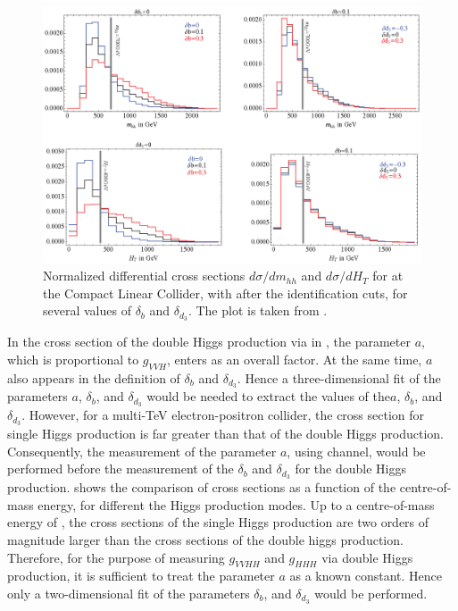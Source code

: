 \begin{figure}[htbp]
\centering
\includegraphics[width=1\textwidth]{theory/MhhHtDistribution}
\caption[]
{Normalized differential cross sections $d\sigma/dm_{hh}$ and $d\sigma/dH_{T}$ for  at the Compact Linear Collider, with  after the identification cuts, for several values of $\delta_{b}$ and $\delta_{d_3}$. The plot is taken from \cite{Contino:2013gna}.}
\label{fig:theoryMhhHtDistribution}
\end{figure}

In the cross section of the double Higgs production via   in , the parameter $a$, which is proportional to $g_{VVH}$, enters as an overall factor. At the same time, $a$ also appears in the definition of $\delta_{b}$ and $\delta_{d_3}$. Hence a three-dimensional fit of the parameters $a$, $\delta_{b}$, and $\delta_{d_3}$ would be needed to extract the values of the$a$, $\delta_{b}$, and $\delta_{d_3}$. However,  for a multi-TeV electron-positron collider, the cross section for single Higgs production is far greater than that of the double Higgs production. Consequently, the measurement of the parameter $a$, using    channel, would be performed before the measurement of the $\delta_{b}$ and $\delta_{d_3}$ for the double Higgs production.   shows the comparison of cross sections as a function of the centre-of-mass energy, for different the Higgs production modes. Up to a centre-of-mass energy of , the cross sections of the single Higgs production are two orders of magnitude larger than the cross sections of the double higgs production. Therefore, for the purpose of measuring $g_{VVHH}$ and $g_{HHH}$ via double Higgs production, it is sufficient to treat the parameter $a$ as a known constant. Hence only a two-dimensional fit of the parameters $\delta_{b}$, and $\delta_{d_3}$ would be performed.

